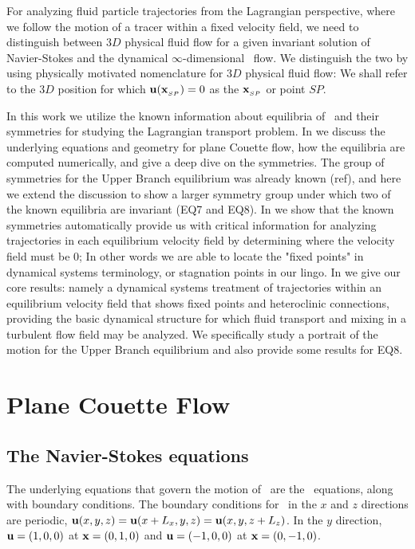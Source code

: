 \documentclass[letter,10pt,openany]{article}
\begin{document}
For analyzing fluid particle trajectories from the Lagrangian perspective, where we follow the motion of a tracer within a fixed velocity field,  we need to distinguish between
$3D$ physical fluid flow for a given invariant solution of Navier-Stokes
and the dynamical $\infty$-dimensional \statesp\ flow. We distinguish the two by using physically motivated nomenclature
for $3D$ physical fluid flow: We shall refer to the $3D$ position
 for which
${\bf u}({\bf x}_{_{SP}})=0$
as the {\em \stagp} ${\bf x}_{_{SP}}$ or point $SP$. 

In this work we utilize the known information about equilibria of \pCf\ and their symmetries for studying the Lagrangian transport problem. In  we discuss the underlying equations and geometry for plane Couette flow, how the equilibria are computed numerically, and give a deep dive on the symmetries. The group of symmetries for the Upper Branch equilibrium was already known (ref), and here we extend the discussion to show a larger symmetry group under which two of the known equilibria are invariant (EQ7 and EQ8).  In  we show that the known symmetries automatically provide us with critical information for analyzing trajectories in each equilibrium velocity field by  determining where the velocity field must be 0; In other words we are able to locate the "fixed points" in dynamical systems terminology, or stagnation points in our lingo. In  we give our core results: namely a dynamical systems treatment of trajectories within an equilibrium velocity field that shows fixed points and heteroclinic connections, providing the basic dynamical structure for which fluid transport and mixing in a turbulent flow field may be analyzed. We specifically study a portrait of the motion for the Upper Branch equilibrium and also provide some results for EQ8.





\section{Plane Couette Flow}
\label{sec:PCF}

\subsection{The Navier-Stokes equations}
 The underlying equations
that govern the motion of \pCf\ are the \NS\ equations,
along with boundary conditions. The boundary conditions for \pCf\ in the $x$
and $z$ directions are periodic,
 $ {\bf u}(x, y, z) = {\bf u}(x+L_x, y, z) =
{\bf u}(x, y, z + L_z) $.
 In the $y$ direction,
 ${\bf u} = (1,0,0)$ at ${\bf x} = (0,1,0)$ and ${\bf u} = (-1,0,0)$ at ${\bf x} =
 (0,-1,0)$.
\end{document}
